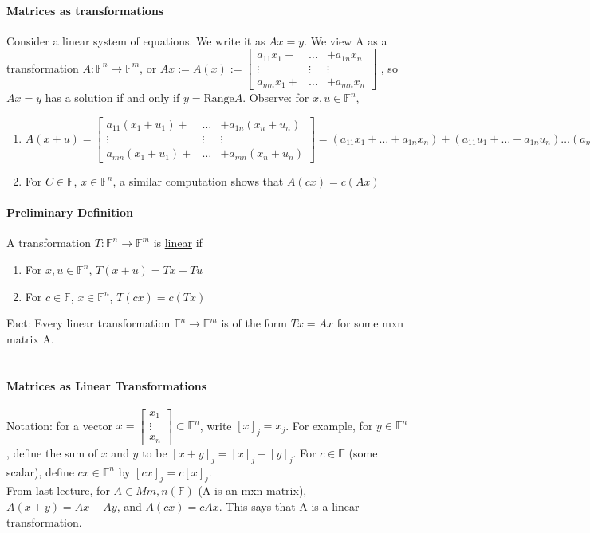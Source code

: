 \documentclass[10pt,letter]{article}
\begin{document}
\paragraph{Matrices as transformations}
Consider a linear system of equations. We write it as $Ax=y$. We view A as a transformation $A:\mathbb{F}^n\rightarrow\mathbb{F}^m$, or $Ax:=A(x):=\begin{bmatrix}a_{11}x_1+&\ldots&+a_{1n}x_n\\ \vdots & \vdots & \vdots \\ a_{mn}x_1+& \ldots & +a_{mn}x_n\end{bmatrix}$ , so $Ax=y$ has a solution if and only if $y=\text{Range}A$. Observe: for $x,u\in\mathbb{F}^n$, \begin{enumerate}
    \item $A(x+u) = \begin{bmatrix}a_{11}(x_1+u_1)+&\ldots&+a_{1n}(x_n+u_n)\\ \vdots & \vdots & \vdots \\ a_{mn}(x_1+u_1)+& \ldots & +a_{mn}(x_n+u_n)\end{bmatrix} = (a_{11}x_1+\ldots+a_{1n}x_n)+(a_{11}u_1+\ldots+a_{1n}u_n)\ldots(a_{m1}x_1+\ldots+a_{mn}x_n)+(a_{m1}u_1+\ldots+a_{mn}u_n)=Ax+Au$
    \item For $C\in\mathbb{F}$, $x\in\mathbb{F}^n$, a similar computation shows that $A(cx)=c(Ax)$
\end{enumerate}

\paragraph{Preliminary Definition}
A transformation $T:\mathbb{F}^n\rightarrow\mathbb{F}^m$ is \underline{linear} if 
\begin{enumerate}
    \item For $x,u\in\mathbb{F}^n$, $T(x+u)=Tx+Tu$
    \item For $c\in\mathbb{F}$, $x\in\mathbb{F}^n$, $T(cx)=c(Tx)$
\end{enumerate}
Fact: Every linear transformation $\mathbb{F}^n\rightarrow\mathbb{F}^m$ is of the form $Tx=Ax$ for some mxn matrix A. 

\section*{}

\paragraph{Matrices as Linear Transformations}
Notation: for a vector $x=\begin{bmatrix}x_1\\\vdots\\x_n\end{bmatrix}\subset\mathbb{F}^n$, write $[x]_j=x_j$. For example, for $y\in\mathbb{F}^n$, define the sum of $x$ and $y$ to be $[x+y]_j=[x]_j+[y]_j$. For $c\in\mathbb{F}$ (some scalar), define $cx\in\mathbb{F}^n$ by $[cx]_j=c[x]_j$. \\ 
From last lecture, for $A\in Mm,n(\mathbb{F})$ (A is an mxn matrix), $A(x+y)=Ax+Ay$, and $A(cx)=cAx$. This says that A is a linear transformation. 
\end{document}
